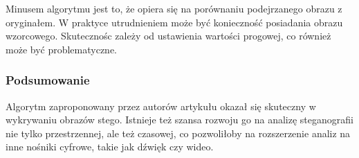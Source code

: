 Minusem algorytmu jest to, że opiera się na porównaniu podejrzanego obrazu z oryginałem. W praktyce utrudnieniem 
może być konieczność posiadania obrazu wzorcowego. Skutecznośc zależy od ustawienia wartości progowej, co 
również może być problematyczne.

\subsubsection{Podsumowanie}
Algorytm zaproponowany przez autorów artykułu okazał się skuteczny w wykrywaniu obrazów stego. Istnieje też 
szansa rozwoju go na analizę steganografii nie tylko przestrzennej, ale też czasowej, co pozwoliłoby na rozszerzenie 
analiz na inne nośniki cyfrowe, takie jak dźwięk czy wideo.